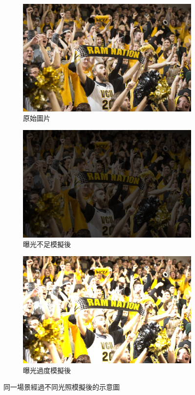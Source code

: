 \begin{figure}[htb]
\centering
\begin{subfigure}[b]{0.3\textwidth}
    \centering
    \includegraphics[width=\textwidth]{figures/same_original}
    \caption{原始圖片}
\end{subfigure}
\begin{subfigure}[b]{0.3\textwidth}
    \centering
    \includegraphics[width=\textwidth]{figures/same_dark}
    \caption{曝光不足模擬後}
\end{subfigure}
\begin{subfigure}[b]{0.3\textwidth}
    \centering
    \includegraphics[width=\textwidth]{figures/same_bright}
    \caption{曝光過度模擬後}
\end{subfigure}
\caption[不同光照模擬下的同一場景]{同一場景經過不同光照模擬後的示意圖}
\label{fig:same_triple}
\end{figure}

